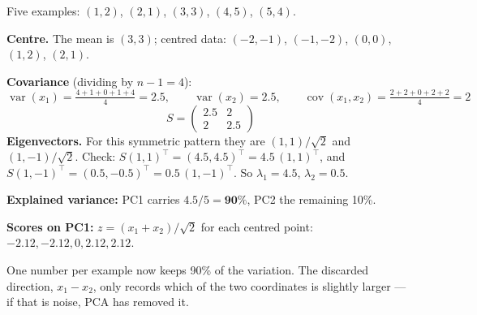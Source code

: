 \begin{worked}
Five examples: $(1, 2)$, $(2, 1)$, $(3, 3)$, $(4, 5)$, $(5, 4)$.

\smallskip
\textbf{Centre.} The mean is $(3, 3)$; centred data: $(-2, -1)$, $(-1, -2)$, $(0, 0)$,
$(1, 2)$, $(2, 1)$.

\textbf{Covariance} (dividing by $n - 1 = 4$):
\[
\operatorname{var}(x_1) = \tfrac{4 + 1 + 0 + 1 + 4}{4} = 2.5,\qquad
\operatorname{var}(x_2) = 2.5,\qquad
\operatorname{cov}(x_1, x_2) = \tfrac{2 + 2 + 0 + 2 + 2}{4} = 2
\]
\[
S = \begin{pmatrix} 2.5 & 2 \\ 2 & 2.5 \end{pmatrix}
\]
\textbf{Eigenvectors.} For this symmetric pattern they are $(1, 1)/\sqrt{2}$ and
$(1, -1)/\sqrt{2}$. Check: $S(1,1)^{\top} = (4.5, 4.5)^{\top} = 4.5\,(1,1)^{\top}$, and
$S(1,-1)^{\top} = (0.5, -0.5)^{\top} = 0.5\,(1,-1)^{\top}$. So
$\lambda_1 = \mathbf{4.5}$, $\lambda_2 = \mathbf{0.5}$.

\textbf{Explained variance:} PC1 carries $4.5/5 = \mathbf{90\%}$, PC2 the remaining 10\%.

\textbf{Scores on PC1:} $z = (x_1 + x_2)/\sqrt{2}$ for each centred point:
$-2.12, -2.12, 0, 2.12, 2.12$.

\smallskip
One number per example now keeps 90\% of the variation. The discarded direction,
$x_1 - x_2$, only records which of the two coordinates is slightly larger --- if that
is noise, PCA has removed it.
\end{worked}

